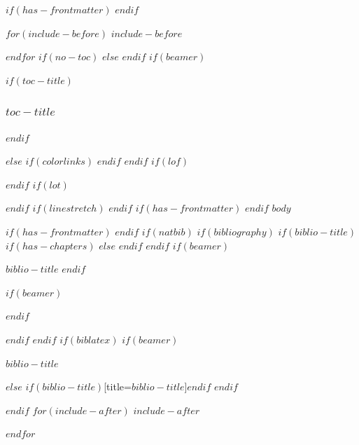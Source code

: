\documentclass[
$if(fontsize)$
  $fontsize$,
$endif$
$if(papersize)$
  $papersize$paper,
$else$
  paper=a4,
$endif$
$if(beamer)$
  ignorenonframetext,
$if(handout)$
  handout,
$endif$
$if(aspectratio)$
  aspectratio=$aspectratio$,
$endif$
$endif$
$for(classoption)$
  $classoption$$sep$,
$endfor$
  ,captions=tableheading
]{$if(beamer)$$documentclass$$else$$if(book)$scrbook$else$scrartcl$endif$$endif$}
\newif\ifbibliography
\begin{document}

$if(has-frontmatter)$
\frontmatter
$endif$

\setcounter{page}{1}

$for(include-before)$
$include-before$

$endfor$
$if(no-toc)$
$else$
\renewcommand*\contentsname{$toc-title$}
\renewcommand*\contentsname{Table of Contents}
$endif$
$if(beamer)$
\begin{frame}[allowframebreaks]
$if(toc-title)$
  \frametitle{$toc-title$}
$endif$
  \tableofcontents[hideallsubsections]
\end{frame}
\newpage
$else$
{
$if(colorlinks)$
\hypersetup{linkcolor=$if(toccolor)$$toccolor$$else$$endif$}
$endif$
\setcounter{tocdepth}{$toc-depth$}
\tableofcontents
\newpage
}
$endif$
$if(lof)$
\listoffigures
$endif$
$if(lot)$
\listoftables
$endif$
$if(linestretch)$
$endif$
$if(has-frontmatter)$
\mainmatter
$endif$
$body$

$if(has-frontmatter)$
\backmatter
$endif$
$if(natbib)$
$if(bibliography)$
$if(biblio-title)$
$if(has-chapters)$
\renewcommand\bibname{$biblio-title$}
$else$
\renewcommand\refname{$biblio-title$}
$endif$
$endif$
$if(beamer)$
\begin{frame}[allowframebreaks]{$biblio-title$}
  \bibliographytrue
$endif$
  
$if(beamer)$
\end{frame}
$endif$

$endif$
$endif$
$if(biblatex)$
$if(beamer)$
\begin{frame}[allowframebreaks]{$biblio-title$}
  \bibliographytrue
  \printbibliography[heading=none]
\end{frame}
$else$
\printbibliography$if(biblio-title)$[title=$biblio-title$]$endif$
$endif$

$endif$
$for(include-after)$
$include-after$

$endfor$
\end{document}
